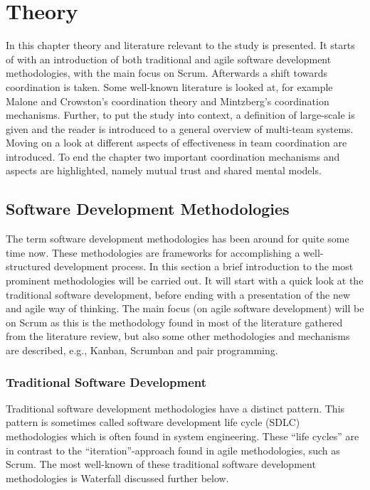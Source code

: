 \chapter{Theory}
\label{theory}

\minitoc

In this chapter theory and literature relevant to the study is presented. It starts of with an introduction of both traditional and agile software development methodologies, with the main focus on Scrum. Afterwards a shift towards coordination is taken. Some well-known literature is looked at, for example Malone and Crowston's coordination theory and Mintzberg's coordination mechanisms. Further, to put the study into context, a definition of large-scale is given and the reader is introduced to a general overview of multi-team systems. Moving on a look at different aspects of effectiveness in team coordination are introduced. To end the chapter two important coordination mechanisms and aspects are highlighted, namely mutual trust and shared mental models.

\section{Software Development Methodologies}

The term software development methodologies has been around for quite some time now. These methodologies are frameworks for accomplishing a well-structured development process. In this section a brief introduction to the most prominent methodologies will be carried out. It will start with a quick look at the traditional software development, before ending with a presentation of the new and agile way of thinking. The main focus (on agile software development) will be on Scrum as this is the methodology found in most of the literature gathered from the literature review, but also some other methodologies and mechanisms are described, e.g., Kanban, Scrumban and pair programming.

\subsection{Traditional Software Development}

Traditional software development methodologies have a distinct pattern. This pattern is sometimes called software development life cycle (SDLC) methodologies which is often found in system engineering. These ``life cycles'' are in contrast to the ``iteration''-approach found in agile methodologies, such as Scrum. The most well-known of these traditional software development methodologies is Waterfall discussed further below.

